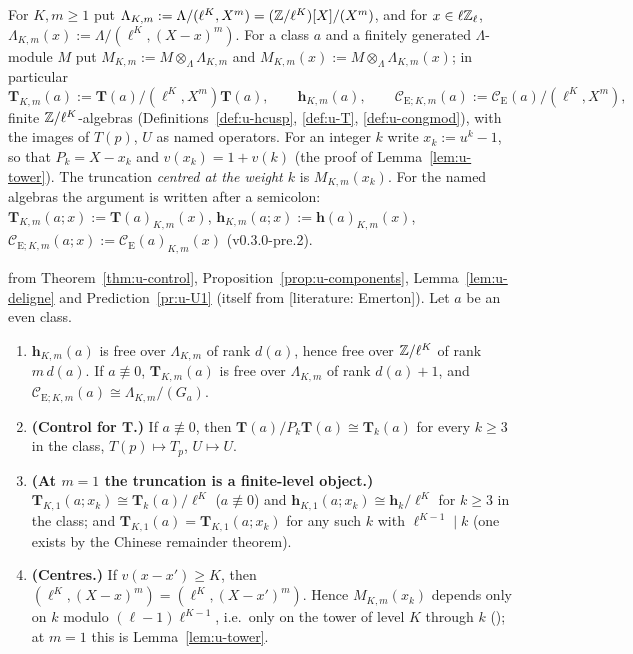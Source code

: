 \documentclass[11pt]{article}
\newcommand{\LIT}[1]{\textsf{[literature: #1]}}   %
\newcommand{\Iw}{\Lambda}                         %
\newcommand{\hcusp}{\mathbf{h}}                   %
\newcommand{\Tu}{\mathbf{T}}                      %
\newcommand{\Pk}[1]{P_{#1}}                       %
\newcommand{\Eis}{\mathrm{E}}
\newcommand{\Cg}{\mathcal{C}}                     %
\newcommand{\Zl}{\Z_\ell}
\begin{document}
\begin{definition}[Truncations]\label{def:u-trunc}
For $K,m\ge1$ put $\Iw_{K,m}:=\Iw/(\ell^{K},X^{m})=(\Z/\ell^{K})[X]/(X^{m})$, and for $x\in\ell\Zl$, $\Iw_{K,m}(x):=\Iw/(\ell^{K},(X-x)^{m})$. For a
class $a$ and a finitely generated $\Iw$-module $M$ put $M_{K,m}:=M\otimes_\Iw\Iw_{K,m}$ and $M_{K,m}(x):=M\otimes_\Iw\Iw_{K,m}(x)$; in particular
\[
  \Tu_{K,m}(a):=\Tu(a)/(\ell^{K},X^{m})\Tu(a),\qquad \hcusp_{K,m}(a),\qquad \Cg_{\Eis;K,m}(a):=\Cg_\Eis(a)/(\ell^{K},X^{m}),
\]
finite $\mathbb{Z}/\ell^{K}$-algebras (Definitions~\ref{def:u-hcusp}, \ref{def:u-T}, \ref{def:u-congmod}), with the images of $T(p)$, $U$ as named operators.
For an integer $k$ write $x_k:=u^{k}-1$, so that $\Pk{k}=X-x_k$ and $v(x_k)=1+v(k)$ (the proof of Lemma~\ref{lem:u-tower}). The truncation
\emph{centred at the weight $k$} is $M_{K,m}(x_k)$. For the named algebras the argument is written after a semicolon:
$\Tu_{K,m}(a;x):=\Tu(a)_{K,m}(x)$, $\hcusp_{K,m}(a;x):=\hcusp(a)_{K,m}(x)$, $\Cg_{\Eis;K,m}(a;x):=\Cg_\Eis(a)_{K,m}(x)$ (v0.3.0-pre.2).
\end{definition}

\begin{proposition}\label{prop:u-truncbasic}
\PROVED{} from Theorem~\ref{thm:u-control}, Proposition~\ref{prop:u-components}, Lemma~\ref{lem:u-deligne} and Prediction~\ref{pr:u-U1} (itself \PROVED{} from \LIT{Emerton}).
Let $a$ be an even class.
\begin{enumerate}
\item $\hcusp_{K,m}(a)$ is free over $\Iw_{K,m}$ of rank $d(a)$, hence free over $\mathbb{Z}/\ell^{K}$ of rank $m\,d(a)$. If $a\not\equiv0$, $\Tu_{K,m}(a)$ is free over
  $\Iw_{K,m}$ of rank $d(a)+1$, and $\Cg_{\Eis;K,m}(a)\cong\Iw_{K,m}/(G_a)$.
\item \textbf{(Control for $\Tu$.)} If $a\not\equiv0$, then $\Tu(a)/\Pk{k}\Tu(a)\cong\Tu_k(a)$ for every $k\ge3$ in the class, $T(p)\mapsto T_p$, $U\mapsto U$.
\item \textbf{(At $m=1$ the truncation is a finite-level object.)} $\Tu_{K,1}(a;x_k)\cong\Tu_k(a)/\ell^{K}$ ($a\not\equiv0$) and $\hcusp_{K,1}(a;x_k)\cong\hcusp_k/\ell^{K}$
  for $k\ge3$ in the class; and $\Tu_{K,1}(a)=\Tu_{K,1}(a;x_k)$ for any such $k$ with $\ell^{K-1}\mid k$ (one exists by the Chinese remainder theorem).
\item \textbf{(Centres.)} If $v(x-x')\ge K$, then $(\ell^{K},(X-x)^{m})=(\ell^{K},(X-x')^{m})$. Hence $M_{K,m}(x_k)$ depends only on $k$ modulo
  $(\ell-1)\ell^{K-1}$, i.e.\ only on the tower of level $K$ through $k$ (); at $m=1$ this is Lemma~\ref{lem:u-tower}.
\end{enumerate}
\end{proposition}
\end{document}
